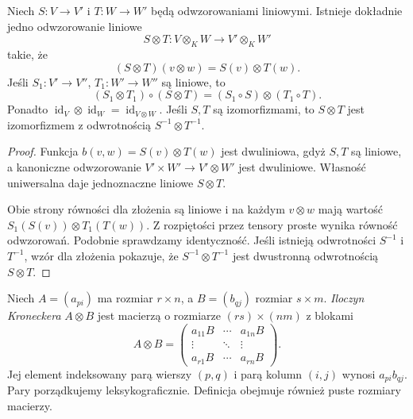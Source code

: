 \begin{twierdzenie}
\label{thm:lin9-odwzorowania}
Niech \(S\colon V\to V'\)
i \(T\colon W\to W'\)
będą odwzorowaniami liniowymi.
Istnieje dokładnie jedno
odwzorowanie liniowe
\[
 S\otimes T\colon V\otimes_KW
       \longrightarrow V'\otimes_KW'
\]
takie, że
\[
 (S\otimes T)(v\otimes w)
 =S(v)\otimes T(w).
\]
Jeśli \(S_1\colon V'\to V''\),
\(T_1\colon W'\to W''\)
są liniowe, to
\[
 (S_1\otimes T_1)\circ(S\otimes T)
 =(S_1\circ S)\otimes(T_1\circ T).
\]
Ponadto
\(\operatorname{id}_V\otimes
 \operatorname{id}_W
 =\operatorname{id}_{V\otimes W}\).
Jeśli \(S,T\) są izomorfizmami,
to \(S\otimes T\) jest
izomorfizmem z odwrotnością
\(S^{-1}\otimes T^{-1}\).
\end{twierdzenie}
\begin{proof}
Funkcja
\(b(v,w)=S(v)\otimes T(w)\)
jest dwuliniowa, gdyż
\(S,T\) są liniowe,
a kanoniczne odwzorowanie
\(V'\times W'\to V'\otimes W'\)
jest dwuliniowe.
Własność uniwersalna
daje jednoznaczne liniowe
\(S\otimes T\).

Obie strony równości dla złożenia
są liniowe i na każdym
\(v\otimes w\) mają wartość
\(S_1(S(v))\otimes T_1(T(w))\).
Z rozpiętości przez tensory proste
wynika równość odwzorowań.
Podobnie sprawdzamy identyczność.
Jeśli istnieją odwrotności \(S^{-1}\)
i \(T^{-1}\), wzór dla złożenia
pokazuje, że
\(S^{-1}\otimes T^{-1}\)
jest dwustronną odwrotnością
\(S\otimes T\).
\end{proof}

\begin{definicja}
\label{def:lin9-kronecker}
Niech \(A=(a_{pi})\)
ma rozmiar \(r\times n\),
a \(B=(b_{qj})\) rozmiar
\(s\times m\).
\emph{Iloczyn Kroneckera}
\(A\otimes B\) jest macierzą
o rozmiarze \((rs)\times(nm)\)
z blokami
\[
 A\otimes B=
 \begin{pmatrix}
 a_{11}B&\cdots&a_{1n}B\\
 \vdots&\ddots&\vdots\\
 a_{r1}B&\cdots&a_{rn}B
 \end{pmatrix}.
\]
Jej element indeksowany
parą wierszy \((p,q)\)
i parą kolumn \((i,j)\)
wynosi \(a_{pi}b_{qj}\).
Pary porządkujemy leksykograficznie.
Definicja obejmuje również
puste rozmiary macierzy.
\end{definicja}

